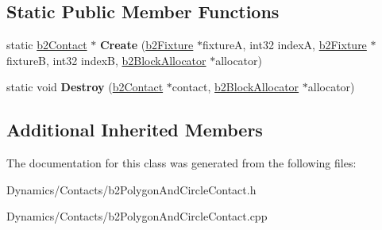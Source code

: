 \subsection*{Static Public Member Functions}
\begin{DoxyCompactItemize}
\item 
\mbox{\label{classb2PolygonAndCircleContact_a0b83e092a7d14f9cdd919fa15ef6058f}} 
static \mbox{\hyperlink{classb2Contact}{b2\+Contact}} $\ast$ {\bfseries Create} (\mbox{\hyperlink{classb2Fixture}{b2\+Fixture}} $\ast$fixtureA, int32 indexA, \mbox{\hyperlink{classb2Fixture}{b2\+Fixture}} $\ast$fixtureB, int32 indexB, \mbox{\hyperlink{classb2BlockAllocator}{b2\+Block\+Allocator}} $\ast$allocator)
\item 
\mbox{\label{classb2PolygonAndCircleContact_a04e9a3fcdcf52821fb90b8206b8bb2f0}} 
static void {\bfseries Destroy} (\mbox{\hyperlink{classb2Contact}{b2\+Contact}} $\ast$contact, \mbox{\hyperlink{classb2BlockAllocator}{b2\+Block\+Allocator}} $\ast$allocator)
\end{DoxyCompactItemize}
\subsection*{Additional Inherited Members}


The documentation for this class was generated from the following files\+:\begin{DoxyCompactItemize}
\item 
Dynamics/\+Contacts/b2\+Polygon\+And\+Circle\+Contact.\+h\item 
Dynamics/\+Contacts/b2\+Polygon\+And\+Circle\+Contact.\+cpp\end{DoxyCompactItemize}
